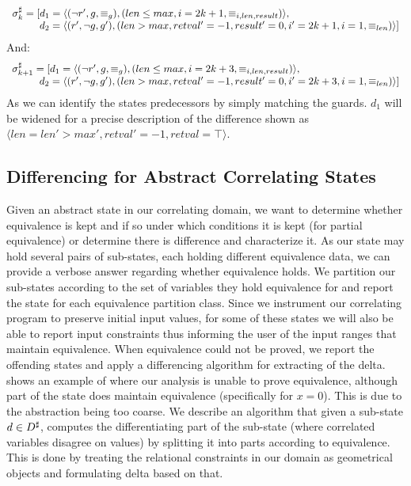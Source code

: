 {\footnotesize
\[
\begin{array}{l}
\sigma^\sharp_{k} = [ d_1 = \langle (\neg r',g,\equiv_{g}),(len \leq max, i = 2k + 1, \equiv_{i,len,result}) \rangle, \\
~~~~~~~~d_2 = \langle (r',\neg g,g'), 
(len > max, retval' = -1, result' = 0, i' = 2k + 1, i = 1, \equiv_{len}) \rangle ]
\end{array}
\]
}
{\footnotesize
And:
\[
\begin{array}{l}
\sigma^\sharp_{k+1} = [ d_1 = \langle (\neg r',g,\equiv_{g}),(len \leq max, i = 2k + 3, \equiv_{i,len,result}) \rangle, \\
~~~~~~~~d_2 = \langle (r',\neg g,g'), 
(len > max, retval' = -1, result' = 0, i' = 2k + 3, i = 1, \equiv_{len}) \rangle ]
\end{array}
\]
}
As we can identify the states predecessors by simply matching the guards. $d_1$ will be widened for a precise description of the difference shown as {\footnotesize $\langle len = len' > max', retval' = -1, retval = \top \rangle$}.

\subsection{Differencing for Abstract Correlating States} 
Given an abstract state in our correlating domain, we want to determine whether equivalence is kept and if so under which conditions it is kept (for partial equivalence) or determine there is difference and characterize it. As our state may hold several pairs of sub-states, each holding different equivalence data, we can provide a verbose answer regarding whether equivalence holds. We partition our sub-states according to the set of variables they hold equivalence for and report the state for each equivalence partition class. Since we instrument our correlating program to preserve initial input values, for some of these states we will also be able to report input constraints thus informing the user of the input ranges that maintain equivalence. When equivalence could not be proved, we report the offending states and apply a differencing algorithm for extracting of the delta.  shows an example of where our analysis is unable to prove equivalence, although part of the state does maintain equivalence (specifically for $x=0$). This is due to the abstraction being too coarse. We describe an algorithm that given a sub-state $d \in D^\sharp$, computes the differentiating part of the sub-state (where correlated variables disagree on values) by splitting it into parts according to equivalence. This is done by treating the relational constraints in our domain as geometrical objects and formulating delta based on that.


